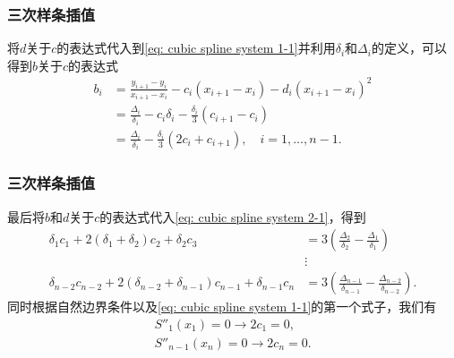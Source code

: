 \documentclass[10pt]{beamer}
\begin{document}
\begin{frame}
\frametitle{三次样条插值}
将$d$关于$c$的表达式代入到\eqref{eq: cubic spline system 1-1}并利用$\delta_i$和$\Delta_i$的定义，可以得到$b$关于$c$的表达式
\begin{align}
\label{eq: b_i about c_i}
b_i & = \frac{y_{i+1} - y_i}{x_{i+1} - x_i} - c_i (x_{i+1} - x_i) - d_i(x_{i+1} - x_i)^2 \nonumber \\
      & = \frac{\Delta_i}{\delta_i} - c_i \delta_i - \frac{\delta_i}{3}(c_{i+1} - c_i) \nonumber \\
      & = \frac{\Delta_i}{\delta_i} - \frac{\delta_i}{3}(2c_i + c_{i+1}), \quad i = 1, \ldots, n-1.
\end{align}
\end{frame}


\begin{frame}
\frametitle{三次样条插值}
最后将$b$和$d$关于$c$的表达式代入\eqref{eq: cubic spline system 2-1}，得到
\begin{align}
\delta_1 c_1 + 2(\delta_1 + \delta_2) c_2 + \delta_2 c_3 &= 3(\frac{\Delta_2}{\delta_2} - \frac{\Delta_1}{\delta_1}) \nonumber \\
& \vdots \nonumber \\
\delta_{n-2} c_{n-2} + 2(\delta_{n-2} + \delta_{n-1}) c_{n-1} + \delta_{n-1} c_n &= 3(\frac{\Delta_{n-1}}{\delta_{n-1}} - \frac{\Delta_{n-2}}{\delta_{n-2}}).
\end{align}
同时根据自然边界条件以及\eqref{eq: cubic spline system 1-1}的第一个式子，我们有
\begin{align}
S''_1(x_1) = 0 \rightarrow 2c_1 = 0, \nonumber \\
S''_{n-1}(x_n) = 0 \rightarrow 2c_n = 0.
\end{align}
\end{frame}
\end{document}
